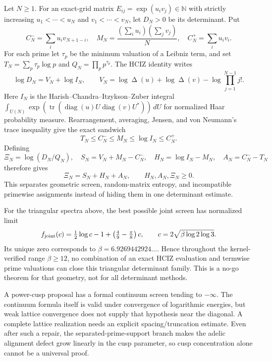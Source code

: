 \documentclass[11pt,oneside]{article}
\theoremstyle{definition}
\theoremstyle{remark}
\newcommand{\N}{\mathbb N}
\newcommand{\DeltaV}{\mathop{\Delta}\nolimits}
\begin{document}
Let $N\ge1$.  For an exact-grid matrix $E_{ij}=\exp(u_iv_j)\in\N$ with strictly increasing
$u_1<\cdots<u_N$ and $v_1<\cdots<v_N$, let $D_N>0$ be its determinant.  Put
\[
 C_N^- =\sum_i u_iv_{N+1-i},\quad
 M_N=\frac{(\sum_i u_i)(\sum_jv_j)}N,\quad
 C_N^+=\sum_i u_iv_i.
\]
For each prime let $\tau_p$ be the minimum valuation of a Leibniz term, and set
$T_N=\sum_p\tau_p\log p$ and $Q_N=\prod_pp^{\tau_p}$.  The HCIZ identity writes
\[
 \log D_N=V_N+\log I_N,\qquad
 V_N=\log\DeltaV(u)+\log\DeltaV(v)-\log\!\prod_{j=1}^{N-1}j!.
\]
Here $I_N$ is the Harish--Chandra--Itzykson--Zuber integral
$\int_{U(N)}\exp(\operatorname{tr}(\operatorname{diag}(u)U
\operatorname{diag}(v)U^*))\,dU$ for normalized Haar probability measure.
Rearrangement, averaging, Jensen, and von Neumann's trace inequality give the exact sandwich
\begin{equation}
 T_N\le C_N^-\le M_N\le\log I_N\le C_N^+.
 \label{fc:eq-hciz-sandwich}
\end{equation}
Defining
\[
 \Xi_N=\log(D_N/Q_N),\quad S_N=V_N+M_N-C_N^-,\quad
 H_N=\log I_N-M_N,\quad A_N=C_N^--T_N
\]
therefore gives
\begin{equation}
 \boxed{\Xi_N=S_N+H_N+A_N},\qquad H_N,A_N,\Xi_N\ge0.
 \label{fc:eq-adelic-decomposition}
\end{equation}
This separates geometric screen, random-matrix entropy, and incompatible primewise
assignments instead of hiding them in one determinant estimate.

For the triangular spectra above, the best possible joint screen has normalized limit
\[
 f_{\rm joint}(c)=\tfrac12\log c-1+\left(\tfrac49-\tfrac\pi8\right)c,\qquad
 c=2\sqrt{\beta\log2\log3}.
\]
Its unique zero corresponds to $\beta=6.9269442924\ldots$.  Hence throughout the
kernel-verified range $\beta\ge12$, no combination of an exact HCIZ evaluation and termwise
prime valuations can close this triangular determinant family.  This is a no-go
theorem for that geometry, not for all determinant methods.

A power-cusp proposal has a formal continuum screen tending to $-\infty$.
The continuum formula itself is valid under convergence of logarithmic energies, but weak
lattice convergence does not supply that hypothesis near the diagonal.  A complete lattice
realization needs an explicit spacing/truncation estimate.  Even after such a repair, the
separated-prime-support branch makes the adelic alignment defect grow linearly in the cusp
parameter, so cusp concentration alone cannot be a universal proof.
\end{document}
